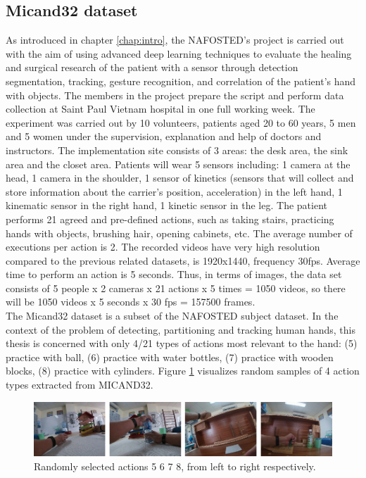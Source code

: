 \subsection{Micand32 dataset} \label{subsec:micand32}
As introduced in chapter \ref{chap:intro}, the NAFOSTED’s project is carried out with the aim of using advanced deep learning techniques to evaluate the healing and surgical research of the patient with a sensor through detection segmentation, tracking, gesture recognition, and correlation of the patient's hand with objects. The members in the project prepare the script and perform data collection at Saint Paul Vietnam hospital in one full working week. The experiment was carried out by 10 volunteers, patients aged 20 to 60 years, 5 men and 5 women under the supervision, explanation and help of doctors and instructors. The implementation site consists of 3 areas: the desk area, the sink area and the closet area. Patients will wear 5 sensors including: 1 camera at the head, 1 camera in the shoulder, 1 sensor of kinetics (sensors that will collect and store information about the carrier's position, acceleration) in the left hand, 1 kinematic sensor in the right hand, 1 kinetic sensor in the leg. The patient performs 21 agreed and pre-defined actions, such as taking stairs, practicing hands with objects, brushing hair, opening cabinets, etc. The average number of executions per action is 2. The recorded videos have very high resolution compared to the previous related datasets, is 1920x1440, frequency 30fps. Average time to perform an action is 5 seconds. Thus, in terms of images, the data set consists of 5 people x 2 cameras x 21 actions x 5 times = 1050 videos, so there will be 1050 videos x 5 seconds x 30 fps = 157500 frames.
\\The Micand32 dataset is a subset of the NAFOSTED subject dataset. In the context of the problem of detecting, partitioning and tracking human hands, this thesis is concerned with only 4/21 types of actions most relevant to the hand: (5) practice with ball, (6) practice with water bottles, (7) practice with wooden blocks, (8) practice with cylinders. Figure \ref{fig:micand32} visualizes random samples of 4 action types extracted from MICAND32.
\begin{figure}
	\centerline{\includegraphics[width=1\linewidth]{Figs/micand32.png}}
	\caption{Randomly selected actions 5 6 7 8, from left to right respectively.}
	\label{fig:micand32}
\end{figure}
